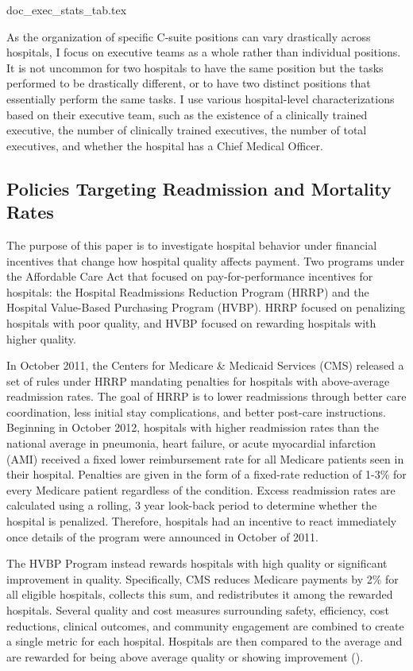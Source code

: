 \documentclass[12pt]{article}
\begin{document}
    {doc_exec_stats_tab.tex}

    As the organization of specific C-suite positions can vary drastically across hospitals, I focus on executive teams as a whole rather than individual positions. It is not uncommon for two hospitals to have the same position but the tasks performed to be drastically different, or to have two distinct positions that essentially perform the same tasks. I use various hospital-level characterizations based on their executive team, such as the existence of a clinically trained executive, the number of clinically trained executives, the number of total executives, and whether the hospital has a Chief Medical Officer. 
  
    \subsection{Policies Targeting Readmission and Mortality Rates}\label{sec:hrrp}

    The purpose of this paper is to investigate hospital behavior under financial incentives that change how hospital quality affects payment. Two programs under the Affordable Care Act that focused on pay-for-performance incentives for hospitals: the Hospital Readmissions Reduction Program (HRRP) and the Hospital Value-Based Purchasing Program (HVBP). HRRP focused on penalizing hospitals with poor quality, and HVBP focused on rewarding hospitals with higher quality. 

    In October 2011, the Centers for Medicare \& Medicaid Services (CMS) released a set of rules under HRRP mandating penalties for hospitals with above-average readmission rates. The goal of HRRP is to lower readmissions through better care coordination, less initial stay complications, and better post-care instructions. Beginning in October 2012, hospitals with higher readmission rates than the national average in pneumonia, heart failure, or acute myocardial infarction (AMI) received a fixed lower reimbursement rate for all Medicare patients seen in their hospital. Penalties are given in the form of a fixed-rate reduction of 1-3\% for every Medicare patient regardless of the condition. Excess readmission rates are calculated using a rolling, 3 year look-back period to determine whether the hospital is penalized. Therefore, hospitals had an incentive to react immediately once details of the program were announced in October of 2011. 

    The HVBP Program instead rewards hospitals with high quality or significant improvement in quality. Specifically, CMS reduces Medicare payments by 2\% for all eligible hospitals, collects this sum, and redistributes it among the rewarded hospitals. Several quality and cost measures surrounding safety, efficiency, cost reductions, clinical outcomes, and community engagement are combined to create a single metric for each hospital. Hospitals are then compared to the average and are rewarded for being above average quality or showing improvement (\cite{CMS_2023}). 
\end{document}
